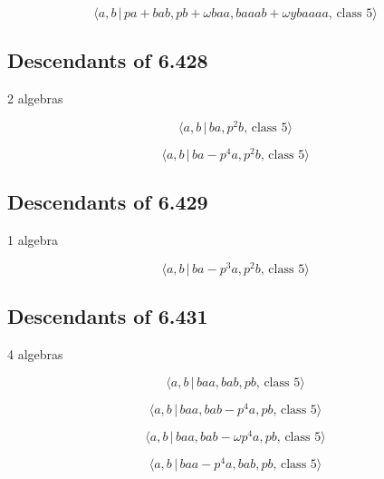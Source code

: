 \documentclass[10pt]{article}
\begin{document}
\begin{equation}
\langle a,b\,|\,pa+bab,pb+\omega baa,baaab+\omega ybaaaa,\,\text{class }%
5\rangle  \tag{7.492}
\end{equation}

\subsection{Descendants of 6.428}

2 algebras

\begin{equation}
\langle a,b\,|\,ba,p^2b,\,\text{class }5\rangle  \tag{7.493}
\end{equation}

\begin{equation}
\langle a,b\,|\,ba-p^4a,p^2b,\,\text{class }5\rangle  \tag{7.494}
\end{equation}

\subsection{Descendants of 6.429}

1 algebra

\begin{equation}
\langle a,b\,|\,ba-p^3a,p^2b,\,\text{class }5\rangle  \tag{7.495}
\end{equation}

\subsection{Descendants of 6.431}

4 algebras

\begin{equation}
\langle a,b\,|\,baa,bab,pb,\,\text{class }5\rangle  \tag{7.496}
\end{equation}

\begin{equation}
\langle a,b\,|\,baa,bab-p^4a,pb,\,\text{class }5\rangle  \tag{7.497}
\end{equation}

\begin{equation}
\langle a,b\,|\,baa,bab-\omega p^{4}a,pb,\,\text{class }5\rangle  \tag{7.498}
\end{equation}

\begin{equation}
\langle a,b\,|\,baa-p^4a,bab,pb,\,\text{class }5\rangle  \tag{7.499}
\end{equation}
\end{document}

